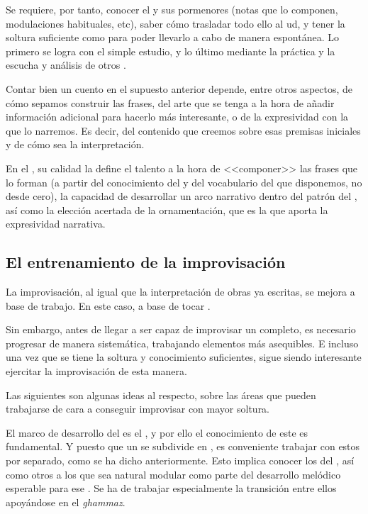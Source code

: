 Se requiere, por tanto, conocer el \maqam y sus pormenores (notas que lo componen, modulaciones habituales, etc), saber cómo trasladar todo ello al ud, y tener la soltura suficiente como para poder llevarlo a cabo de manera espontánea. Lo primero se logra con el simple estudio, y lo último mediante la práctica y la escucha y análisis de otros \taqasimb.

Contar bien un cuento en el supuesto anterior depende, entre otros aspectos, de cómo sepamos construir las frases, del arte que se tenga a la hora de añadir información adicional para hacerlo más interesante, o de la expresividad con la que lo narremos. Es decir, del contenido que creemos sobre esas premisas iniciales y de cómo sea la interpretación.

En el \taqsimb, su calidad la define el talento a la hora de <<componer>> las frases que lo forman (a partir del conocimiento del \maqam y del vocabulario del que disponemos, no desde cero), la capacidad de desarrollar un arco narrativo dentro del patrón del \maqamb, así como la elección acertada de la ornamentación, que es la que aporta la expresividad narrativa.

\subsection{El entrenamiento de la improvisación}

La improvisación, al igual que la interpretación de obras ya escritas, se mejora a base de trabajo. En este caso, a base de tocar \taqasimb.

Sin embargo, antes de llegar a ser capaz de improvisar un \taqsim completo, es necesario progresar de manera sistemática, trabajando elementos más asequibles. E incluso una vez que se tiene la soltura y conocimiento suficientes, sigue siendo interesante ejercitar la improvisación de esta manera.

Las siguientes son algunas ideas al respecto, sobre las áreas que pueden trabajarse de cara a conseguir improvisar con mayor soltura.

El marco de desarrollo del \taqsim es el \maqamb, y por ello el conocimiento de este es fundamental. Y puesto que un \maqam se subdivide en \ashnasb, es conveniente trabajar con estos por separado, como se ha dicho anteriormente. Esto implica conocer los \ashnas del \maqamb, así como otros a los que sea natural modular como parte del desarrollo melódico esperable para ese \maqamb. Se ha de trabajar especialmente la transición entre ellos apoyándose en el \emph{ghammaz}.

